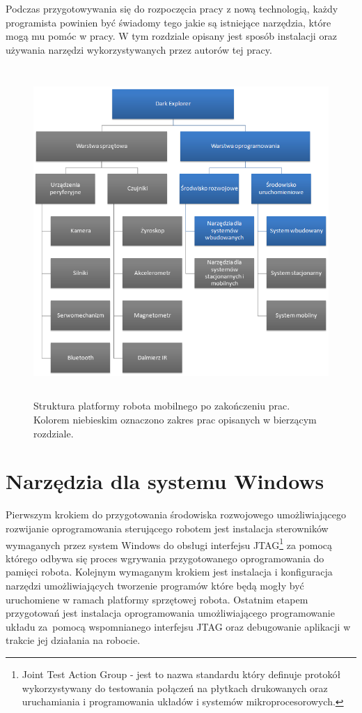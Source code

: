 Podczas przygotowywania się do rozpoczęcia pracy z nową technologią, każdy
programista powinien być świadomy tego jakie są istniejące narzędzia, które mogą
mu pomóc w pracy. W tym rozdziale opisany jest sposób instalacji oraz używania
narzędzi wykorzystywanych przez autorów tej pracy.

\begin{figure}[!ht]
 \centering
 \includegraphics[height=125mm]{../images/ch03/dark_explorer_platform_ide_embeded.png}
 \caption{Struktura platformy robota mobilnego po zakończeniu prac. Kolorem niebieskim oznaczono zakres prac opisanych w bierzącym rozdziale.}
 \label{fig:DarkExplorerPlatformIDE}
\end{figure}

\section{Narzędzia dla systemu Windows}
\label{sec:embeded-win-tools}
Pierwszym krokiem do przygotowania środowiska rozwojowego umożliwiającego
rozwijanie oprogramowania sterującego robotem jest instalacja sterowników
wymaganych przez system Windows do obsługi interfejsu JTAG\footnote{Joint Test
Action Group - jest to nazwa standardu który definuje protokół wykorzystywany do
testowania połączeń na płytkach drukowanych oraz uruchamiania i programowania
układów i systemów mikroprocesorowych. } za pomocą którego odbywa się proces
wgrywania przygotowanego oprogramowania do pamięci robota. Kolejnym wymaganym
krokiem jest instalacja i konfiguracja narzędzi umożliwiających tworzenie
programów które będą mogły być uruchomiene w ramach platformy sprzętowej
robota. Ostatnim etapem przygotowań jest instalacja oprogramowania umożliwiającego programowanie układu za~pomocą wspomnianego interfejsu JTAG oraz
debugowanie aplikacji w trakcie jej działania na robocie.

